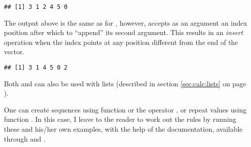 \documentclass[krantz2]{krantz}\usepackage{knitr}
\begin{document}
\begin{knitrout}\footnotesize
{}\color{fgcolor}\begin{kframe}
\begin{alltt}
\end{alltt}
\begin{verbatim}
## [1] 3 1 2 4 5 0
\end{verbatim}
\end{kframe}
\end{knitrout}

The output above is the same as for , however,  accepts as an argument an index position after which to ``append'' its second argument. This results in an \emph{insert} operation when the index points at any position different from the end of the vector.

\begin{knitrout}\footnotesize
{}\color{fgcolor}\begin{kframe}
\begin{alltt}
    \hlstd{=} \hlstd{)}
\end{alltt}
\begin{verbatim}
## [1] 3 1 4 5 0 2
\end{verbatim}
\end{kframe}
\end{knitrout}

Both  and  can also be used with lists (described in section \ref{sec:calc:lists} on page \pageref{sec:calc:lists}).

\begin{playground}\label{pg:seq:rep}
One can create sequences using function  or the operator \Roperator{:}, or repeat values using function . In this case, I leave to the reader to work out the rules by running these and his/her own examples, with the help of the documentation, available through  and .

\begin{knitrout}\footnotesize
{}\color{fgcolor}\begin{kframe}
\begin{alltt}
 \hlkwb{<-} \hlopt{-}\hlopt{:}
 \hlkwb{<-} \hlopt{:-}
 \hlkwb{<-} \hlstd{(} \hlstd{=} \hlopt{-}\hlstd{,}  \hlstd{=} \hlstd{,}  \hlstd{=} \hlstd{)}
 \hlkwb{<-} \hlstd{(}\hlopt{-}\hlstd{,} \hlstd{)}
\end{alltt}
\end{kframe}
\end{knitrout}

\end{playground}
\end{document}
